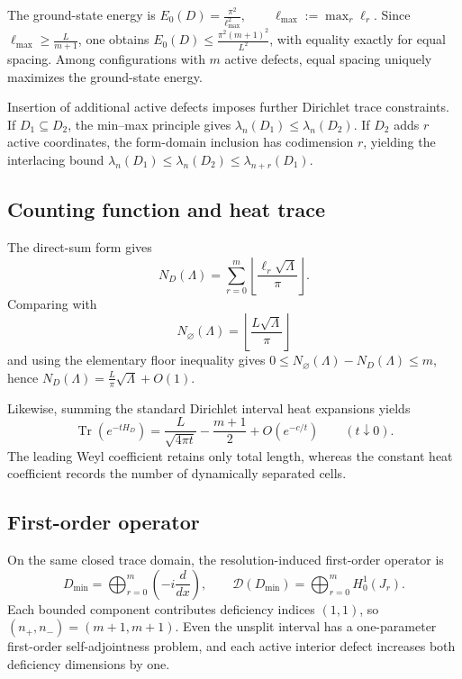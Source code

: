 \documentclass[11pt]{article}
\theoremstyle{plain}
\theoremstyle{definition}
\begin{document}
The ground-state energy is
\(E_0(D) = \frac{\pi^2}{\ell_{\max}^2}, \qquad \ell_{\max}:=\max_r\ell_r\).
Since
\(\ell_{\max}\geq\frac{L}{m+1}\),
one obtains
\(E_0(D) \leq \frac{\pi^2(m+1)^2}{L^2}\),
with equality exactly for equal spacing. Among configurations with
\(m\) active defects, equal spacing uniquely maximizes the ground-state
energy.

Insertion of additional active defects imposes further Dirichlet trace
constraints. If \(D_1\subseteq D_2\), the min--max principle gives
\(\lambda_n(D_1) \leq \lambda_n(D_2)\).
If \(D_2\) adds \(r\) active coordinates, the form-domain inclusion has
codimension \(r\), yielding the interlacing bound
\(\lambda_n(D_1) \leq \lambda_n(D_2) \leq \lambda_{n+r}(D_1)\).

\subsection{Counting function and heat trace}
\label{subsec:multiinterval-counting}
\label{subsec:multiinterval-heat}

The direct-sum form gives
\[
  N_D(\Lambda)
  =
  \sum_{r=0}^{m}
  \left\lfloor
    \frac{\ell_r\sqrt{\Lambda}}{\pi}
  \right\rfloor.
\]
Comparing with
\[
  N_\varnothing(\Lambda)
  =
  \left\lfloor
    \frac{L\sqrt{\Lambda}}{\pi}
  \right\rfloor
\]
and using the elementary floor inequality gives
\(0 \leq N_\varnothing(\Lambda)-N_D(\Lambda) \leq m\),
hence
\(N_D(\Lambda) = \frac{L}{\pi}\sqrt{\Lambda} + O(1)\).

Likewise, summing the standard Dirichlet interval heat expansions yields
\[
  \operatorname{Tr}(e^{-tH_D})
  =
  \frac{L}{\sqrt{4\pi t}}
  -
  \frac{m+1}{2}
  +
  O(e^{-c/t})
  \qquad
  (t\downarrow0).
\]
The leading Weyl coefficient retains only total length, whereas the constant
heat coefficient records the number of dynamically separated cells.

\subsection{First-order operator}
\label{subsec:multiinterval-first-order}

On the same closed trace domain, the resolution-induced first-order
operator is
\[
  D_{\min}
  =
  \bigoplus_{r=0}^{m}
  \left(
    -i\frac{d}{dx}
  \right),
  \qquad
  \mathcal D(D_{\min})
  =
  \bigoplus_{r=0}^{m}H^1_0(J_r).
\]
Each bounded component contributes deficiency indices \((1,1)\), so
\((n_+,n_-)=(m+1,m+1)\).
Even the unsplit interval has a one-parameter first-order
self-adjointness problem, and each active interior defect increases both
deficiency dimensions by one.
\end{document}
